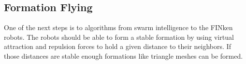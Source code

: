 \subsection{Formation Flying}
One of the next steps is to  algorithms from swarm intelligence to the FINken robots.
The robots should be able to form a stable formation by using virtual attraction and repulsion forces to hold a given distance to their neighbors.
If those distances are stable enough formations like triangle meshes can be formed.

